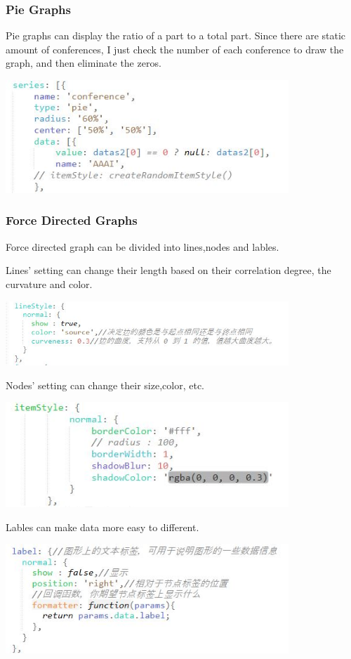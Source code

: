 \documentclass[10pt,twoside,a4paper,titlepage]{article}
\begin{document}
		\subsubsection{Pie Graphs}
			\par Pie graphs can display the ratio of a part to a total part. Since there are static amount of conferences, I just check the number of each conference to draw the graph, and then eliminate the zeros. \par
			\includegraphics[width=0.8\textwidth]{gjl/13.jpg}\par

		\subsubsection{Force Directed Graphs}
			\par Force directed graph can be divided into lines,nodes and lables. 
			\par Lines' setting can change their length based on their correlation degree, the curvature and color.\par
			\includegraphics[width=0.8\textwidth]{gjl/08.jpg}\par
			\par Nodes' setting can change their size,color, etc.\par
			\includegraphics[width=0.8\textwidth]{gjl/09.jpg}\par
			\par Lables can make data more easy to different.\par
			\includegraphics[width=0.8\textwidth]{gjl/10.jpg}\par
			
\end{document}
